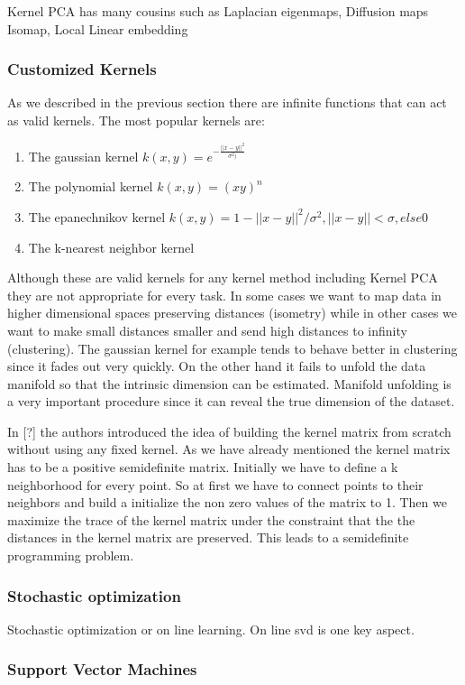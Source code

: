 \documentclass[12pt,letterpaper,doublespaced,ETD,dvips,proposal]{gtthesis}
\begin{document}
\begin{Body}
Kernel PCA has many cousins such as Laplacian eigenmaps, Diffusion
maps Isomap, Local Linear embedding

\subsubsection{Customized Kernels}
As we described in the previous section there are infinite functions
that can act as valid kernels. The most popular kernels are:
\begin{enumerate}
  \item The gaussian kernel $k(x, y)=e^{-\frac{||x-y||^2}{\sigma^2)}}$
  \item The polynomial kernel $k(x, y)=(xy)^n$
  \item The epanechnikov kernel $k(x, y)=1-||x-y||^2/\sigma^2, ||x-y||<\sigma, else 0$
  \item The k-nearest neighbor kernel
\end{enumerate}

Although these are valid kernels for any kernel method including
Kernel PCA they are not appropriate for every task. In some cases we
want to map data in higher dimensional spaces preserving distances
(isometry) while in other cases we want to make small distances
smaller and send high distances to infinity (clustering). The
gaussian kernel for example tends to behave better in clustering
since it fades out very quickly. On the other hand it fails to
unfold the data manifold so that the intrinsic dimension can be
estimated. Manifold unfolding is a very important procedure since it
can reveal the true dimension of the dataset.

In [?] the authors introduced the idea of building the kernel matrix
from scratch without using any fixed kernel. As we have already
mentioned the kernel matrix has to be a positive semidefinite
matrix. Initially we have to define a k neighborhood  for every
point. So at first we have to connect points to their neighbors and
build a initialize the non zero values of the matrix to 1. Then we
maximize the trace of the kernel matrix under the constraint that
the the distances in the kernel matrix are preserved. This leads to
a semidefinite programming problem.
\subsubsection{Stochastic optimization}
Stochastic optimization or on line learning. On line svd is one key
aspect.
\subsubsection{Support Vector Machines}

\end{Body}
\end{document}
